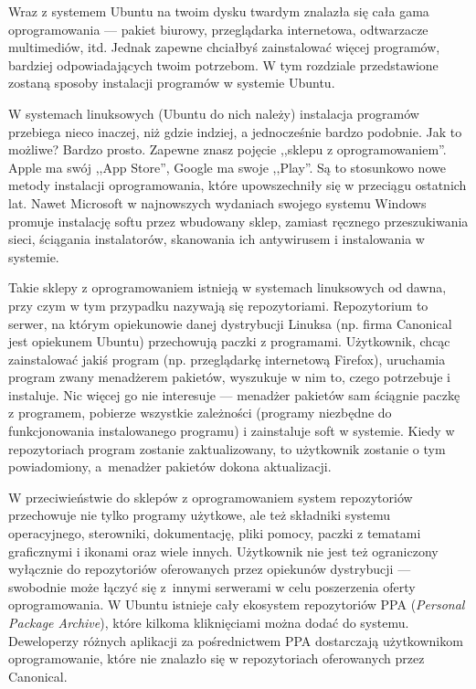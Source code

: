 \label{instalacja_oprogramowania}Wraz z systemem Ubuntu na twoim dysku twardym znalazła się cała gama oprogramowania --- pakiet biurowy, przeglądarka internetowa, odtwarzacze multimediów, itd. Jednak zapewne chciałbyś zainstalować więcej programów, bardziej odpowiadających twoim potrzebom. W tym rozdziale przedstawione zostaną sposoby instalacji programów w systemie Ubuntu.

W systemach linuksowych (Ubuntu do nich należy) instalacja programów przebiega nieco inaczej, niż gdzie indziej, a jednocześnie bardzo podobnie. Jak to możliwe? Bardzo prosto. Zapewne znasz pojęcie ,,sklepu z oprogramowaniem''. Apple ma swój ,,App Store'', Google ma swoje ,,Play''. Są to stosunkowo nowe metody instalacji oprogramowania, które upowszechniły się w przeciągu ostatnich lat. Nawet Microsoft w najnowszych wydaniach swojego systemu Windows promuje instalację softu przez wbudowany sklep, zamiast ręcznego przeszukiwania sieci, ściągania instalatorów, skanowania ich antywirusem i instalowania w systemie.

Takie sklepy z oprogramowaniem istnieją w systemach linuksowych od dawna, przy czym w tym przypadku nazywają się \textcolor{ubuntu_orange}{repozytoriami}. Repozytorium to serwer, na którym opiekunowie danej dystrybucji Linuksa (np. firma Canonical jest opiekunem Ubuntu) przechowują paczki z programami. Użytkownik, chcąc zainstalować jakiś program (np. przeglądarkę internetową Firefox), uruchamia program zwany \textcolor{ubuntu_orange}{menadżerem pakietów}, wyszukuje w nim to, czego potrzebuje i instaluje. Nic więcej go nie interesuje --- menadżer pakietów sam ściągnie paczkę z programem, pobierze wszystkie zależności (programy niezbędne do funkcjonowania instalowanego programu) i zainstaluje soft w systemie. Kiedy w repozytoriach program zostanie zaktualizowany, to użytkownik zostanie o tym powiadomiony, a~menadżer pakietów dokona aktualizacji.

W przeciwieństwie do sklepów z oprogramowaniem system repozytoriów przechowuje nie tylko programy użytkowe, ale też składniki systemu operacyjnego, sterowniki, dokumentację, pliki pomocy, paczki z tematami graficznymi i ikonami oraz wiele innych. Użytkownik nie jest też ograniczony wyłącznie do repozytoriów oferowanych przez opiekunów dystrybucji --- swobodnie może łączyć się z~innymi serwerami w celu poszerzenia oferty oprogramowania. W Ubuntu istnieje cały ekosystem repozytoriów PPA (\textit{Personal Package Archive}), które kilkoma kliknięciami można dodać do systemu. Deweloperzy różnych aplikacji za pośrednictwem PPA dostarczają użytkownikom oprogramowanie, które nie znalazło się w repozytoriach oferowanych przez Canonical.

